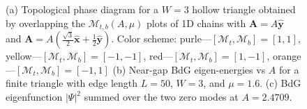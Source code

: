 \documentclass[aps,prb,showpacs,amsmath,amssymb,superscriptaddress]{revtex4-2}
\let\oldhat\hat
\renewcommand{\hat}[1]{\oldhat{\mathbf{#1}}}
\begin{document}
\begin{figure}[ht]
  \hspace{28pt}
   \\
  \vspace{-20pt}
   \\
  \hspace{70pt}
  \caption{(a) Topological phase diagram for a $W=3$ hollow triangle obtained by overlapping the $\mathcal{M}_{t,b}(A, \mu)$ plots of 1D chains with $\mathbf A = A\hat{y}$ and $\mathbf A = A(\frac{\sqrt{3}}{2}\hat{x}+\frac{1}{2}\hat{y})$. Color scheme: purle---$[\mathcal{M}_t,\mathcal{M}_b]=[1,1]$, yellow---$[\mathcal{M}_t,\mathcal{M}_b]=[-1,-1]$, red---$[\mathcal{M}_t,\mathcal{M}_b]=[1,-1]$, orange---$[\mathcal{M}_t,\mathcal{M}_b]=[-1,1]$ (b) Near-gap BdG eigen-energies vs $A$ for a finite triangle with edge length $L=50$, $W=3$, and $\mu=1.6$. (c) BdG eigenfunction $|\Psi|^2$ summed over the two zero modes at $A=2.4709$.}
  \label{fig: supp pd}
\end{figure}
\end{document}

